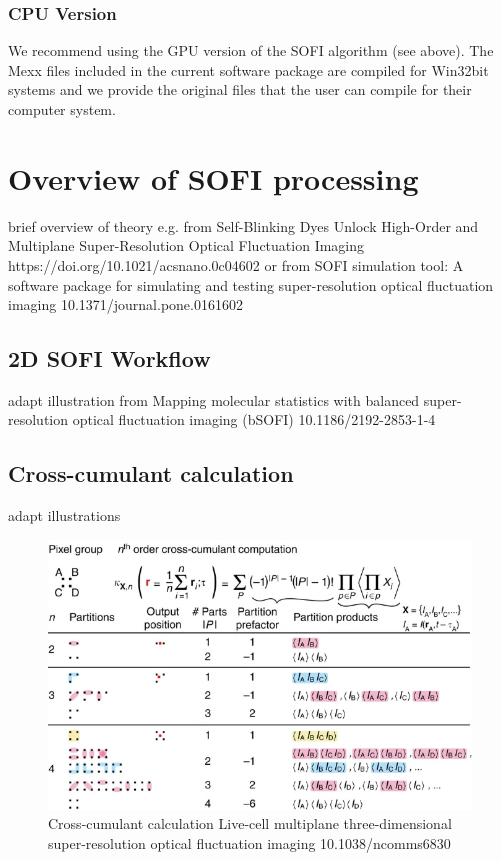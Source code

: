 \documentclass[final]{scrartcl}
\begin{document}
\subsubsection*{CPU Version}
    We recommend using the GPU version of the SOFI algorithm (see above). The Mexx
    files included in the current software package are compiled for Win32bit
    systems and we provide the original files that the user can compile for their
    computer system.

\section{Overview of SOFI processing}
brief overview of theory e.g. from Self-Blinking Dyes Unlock High-Order and Multiplane Super-Resolution Optical Fluctuation Imaging https://doi.org/10.1021/acsnano.0c04602 or from SOFI simulation tool: A software package for simulating and testing super-resolution optical fluctuation imaging 10.1371/journal.pone.0161602

\subsection{2D SOFI Workflow}
adapt illustration from Mapping molecular statistics with balanced super-resolution optical fluctuation imaging (bSOFI) 10.1186/2192-2853-1-4 
\subsection{Cross-cumulant calculation}
adapt illustrations
\begin{figure}[h]
  \includegraphics[width=0.5\linewidth]{cross-cumulantCalculation.png}
  \caption{Cross-cumulant calculation Live-cell multiplane three-dimensional super-resolution optical fluctuation imaging 10.1038/ncomms6830}
  \label{fig:CCC}
\end{figure}
\end{document}
